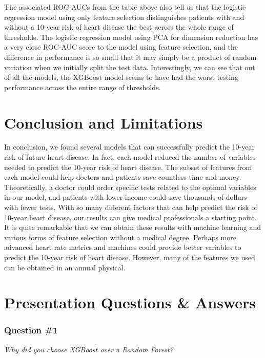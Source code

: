 \documentclass[10pt]{article}
\begin{document}
The associated ROC-AUCs from the table above also tell us that the logistic regression model using only feature selection distinguishes patients with and without a 10-year risk of heart disease the best across the whole range of thresholds. The logistic regression model using PCA for dimension reduction has a very close ROC-AUC score to the model using feature selection, and the difference in performance is so small that it may simply be a product of random variation when we initially split the test data. Interestingly, we can see that out of all the models, the XGBoost model seems to have had the worst testing performance across the entire range of thresholds.


\section*{Conclusion and Limitations}

In conclusion, we found several models that can successfully predict the 10-year risk of future heart disease. In fact, each model reduced the number of variables needed to predict the 10-year risk of heart disease. The subset of features from each model could help doctors and patients save countless time and money. Theoretically, a doctor could order specific tests related to the optimal variables in our model, and patients with lower income could save thousands of dollars with fewer tests. With so many different factors that can help predict the risk of 10-year heart disease, our results can give medical professionals a starting point. It is quite remarkable that we can obtain these results with machine learning and various forms of feature selection without a medical degree. Perhaps more advanced heart rate metrics and machines could provide better variables to predict the 10-year risk of heart disease. However, many of the features we used can be obtained in an annual physical. 

\newpage

\section*{Presentation Questions \& Answers}

\subsubsection*{Question \#1}

\textit{Why did you choose XGBoost over a Random Forest?}
\end{document}
